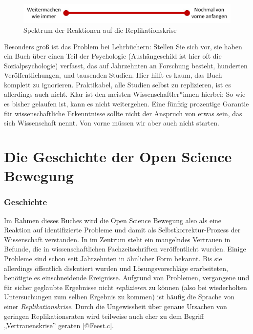 \documentclass[
  letterpaper,
  DIV=11,
  numbers=noendperiod]{scrreprt}
\begin{document}
\begin{figure}[H]

{\centering \includegraphics{images/spektrumreaktionen.jpg}

}

\caption{Spektrum der Reaktionen auf die Replikationskrise}

\end{figure}%

Besonders groß ist das Problem bei Lehrbüchern: Stellen Sie sich vor,
sie haben ein Buch über einen Teil der Psychologie (Aushängeschild ist
hier oft die Sozialpsychologie) verfasst, das auf Jahrzehnten an
Forschung besteht, hunderten Veröffentlichungen, und tausenden Studien.
Hier hilft es kaum, das Buch komplett zu ignorieren. Praktikabel, alle
Studien selbst zu replizieren, ist es allerdings auch nicht. Klar ist
den meisten Wissenschaftler*innen hierbei: So wie es bisher gelaufen
ist, kann es nicht weitergehen. Eine fünfzig prozentige Garantie für
wissenschaftliche Erkenntnisse sollte nicht der Anspruch von etwas sein,
das sich Wissenschaft nennt. Von vorne müssen wir aber auch nicht
starten.

\part{Die Geschichte der Open Science Bewegung}

\section*{Geschichte}\label{geschichte}


Im Rahmen dieses Buches wird die Open Science Bewegung also als eine
Reaktion auf identifizierte Probleme und damit als
Selbstkorrektur-Prozess der Wissenschaft verstanden. In im Zentrum steht
ein mangelndes Vertrauen in Befunde, die in wissenschaftlichen
Fachzeitschriften veröffentlicht wurden. Einige Probleme sind schon seit
Jahrzehnten in ähnlicher Form bekannt. Bis sie allerdings öffentlich
diskutiert wurden und Lösungsvorschläge erarbeiteten, benötigte es
einschneidende Ereignisse. Aufgrund von Problemen, vergangene und für
sicher geglaubte Ergebnisse nicht \emph{replizieren} zu können (also bei
wiederholten Untersuchungen zum selben Ergebnis zu kommen) ist häufig
die Sprache von einer \emph{Replikationskrise}. Durch die Ungewissheit
über genaue Ursachen von geringen Replikationsraten wird teilweise auch
eher zu dem Begriff „Vertrauenskrise'' geraten {[}@Feest.c{]}.
\end{document}
